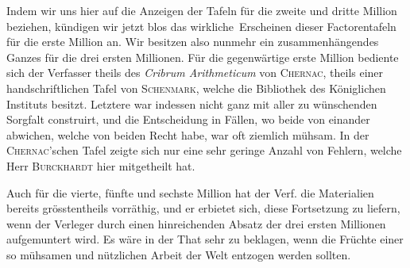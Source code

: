Indem wir uns hier auf die Anzeigen der Tafeln für die zweite und dritte Million beziehen, kündigen wir jetzt blos das wirkliche\textperiodcentered\ Erscheinen dieser Factorentafeln für die erste Million an. Wir besitzen also nunmehr ein zusammenhängendes Ganzes für die drei ersten Millionen. Für die gegenwärtige erste Million bediente sich der Verfasser theils des \emph{Cribrum Arithmeticum} von \textsc{Chernac}, theils einer handschriftlichen Tafel von \textsc{Schenmark}, welche die Bibliothek des Königlichen Instituts besitzt. Letztere war indessen nicht ganz mit aller zu wünschenden Sorgfalt construirt, und die Entscheidung in Fällen, wo beide von einander abwichen, welche von beiden Recht habe, war oft ziemlich mühsam. In der \textsc{Chernac}'schen Tafel zeigte sich nur eine sehr geringe Anzahl von Fehlern, welche Herr \textsc{Burckhardt} hier mitgetheilt hat.

Auch für die vierte, fünfte und sechste Million hat der Verf. die Materialien bereits grösstentheils vorräthig, und er erbietet sich, diese Fortsetzung zu liefern, wenn der Verleger durch einen hinreichenden Absatz der drei ersten Millionen aufgemuntert wird. Es wäre in der That sehr zu beklagen, wenn die Früchte einer so mühsamen und nützlichen Arbeit der Welt entzogen werden sollten.
